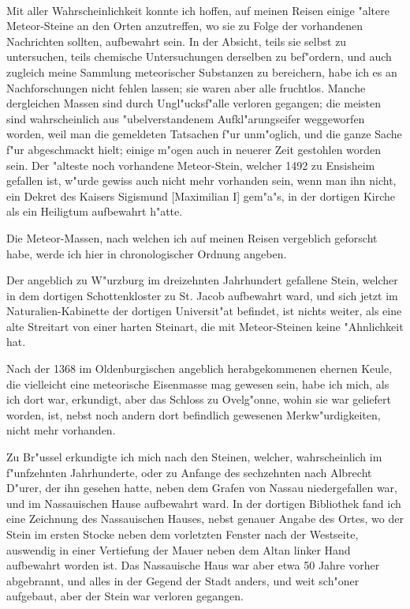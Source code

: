 \documentclass[a4paper, 11pt, oneside, polutonikogreek, german]{article}
\begin{document}
\paragraph{}
Mit aller Wahrscheinlichkeit konnte ich hoffen, auf meinen Reisen einige "altere Meteor-Steine an den Orten anzutreffen, wo sie zu Folge der vorhandenen Nachrichten sollten, aufbewahrt sein. In der Absicht, teils sie selbst zu untersuchen, teils chemische Untersuchungen derselben zu bef"ordern, und auch zugleich meine Sammlung meteorischer Substanzen zu bereichern, habe ich es an Nachforschungen nicht fehlen lassen; sie waren aber alle fruchtlos. Manche dergleichen Massen sind durch Ungl"ucksf"alle verloren gegangen; die meisten sind wahrscheinlich aus "ubelverstandenem Aufkl"arungseifer weggeworfen worden, weil man die gemeldeten Tatsachen f"ur unm"oglich, und die ganze Sache f"ur abgeschmackt hielt; einige m"ogen auch in neuerer Zeit gestohlen worden sein. Der "alteste noch vorhandene Meteor-Stein, welcher 1492 zu Ensisheim gefallen ist, w"urde gewiss auch nicht mehr vorhanden sein, wenn man ihn nicht, ein Dekret des Kaisers Sigismund [Maximilian I] gem"a"s, in der dortigen Kirche als ein Heiligtum aufbewahrt h"atte.

Die Meteor-Massen, nach welchen ich auf meinen Reisen vergeblich geforscht habe, werde ich hier in chronologischer Ordnung angeben.

Der angeblich zu W"urzburg im dreizehnten Jahrhundert gefallene Stein, welcher in dem dortigen Schottenkloster zu St. Jacob aufbewahrt ward, und sich jetzt im Naturalien-Kabinette der dortigen Universit"at befindet, ist nichts weiter, als eine alte Streitart von einer harten Steinart, die mit Meteor-Steinen keine "Ahnlichkeit hat.

Nach der 1368 im Oldenburgischen angeblich herabgekommenen ehernen Keule, die vielleicht eine meteorische Eisenmasse mag gewesen sein, habe ich mich, als ich dort war, erkundigt, aber das Schloss zu Ovelg"onne, wohin sie war geliefert worden, ist, nebst noch andern dort befindlich gewesenen Merkw"urdigkeiten, nicht mehr vorhanden.

Zu Br"ussel erkundigte ich mich nach den Steinen, welcher, wahrscheinlich im f"unfzehnten Jahrhunderte, oder zu Anfange des sechzehnten nach Albrecht D"urer, der ihn gesehen hatte, neben dem Grafen von Nassau niedergefallen war, und im Nassauischen Hause aufbewahrt ward. In der dortigen Bibliothek fand ich eine Zeichnung des Nassauischen Hauses, nebst genauer Angabe des Ortes, wo der Stein im ersten Stocke neben dem vorletzten Fenster nach der Westseite, auswendig in einer Vertiefung der Mauer neben dem Altan linker Hand aufbewahrt worden ist. Das Nassauische Haus war aber etwa 50 Jahre vorher abgebrannt, und alles in der Gegend der Stadt anders, und weit sch"oner aufgebaut, aber der Stein war verloren gegangen.
\end{document}
